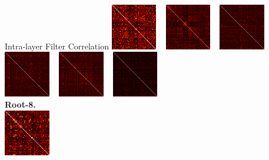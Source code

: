 \documentclass[t,xcolor=dvipsnames]{beamer}
\begin{document}
\begin{frame}[fragile]{Intra-layer Filter Correlation}
    \includegraphics[width=0.15\textwidth]{../Figs/Raster/ninroot8/corrcoef_conv2.png}
~
    \includegraphics[width=0.15\textwidth]{../Figs/Raster/ninroot8/corrcoef_conv4.png}
~
    \includegraphics[width=0.15\textwidth]{../Figs/Raster/ninroot8/corrcoef_conv5.png}
~
    \includegraphics[width=0.15\textwidth]{../Figs/Raster/ninroot8/corrcoef_conv6.png}
~
    \includegraphics[width=0.15\textwidth]{../Figs/Raster/ninroot8/corrcoef_conv8.png}
~
    \includegraphics[width=0.15\textwidth]{../Figs/Raster/ninroot8/corrcoef_conv9.png}\\
\textbf{Root-8.}\\
    \includegraphics[width=0.15\textwidth]{../Figs/Raster/ninroot32/corrcoef_conv2.png}

\end{frame}
\end{document}
